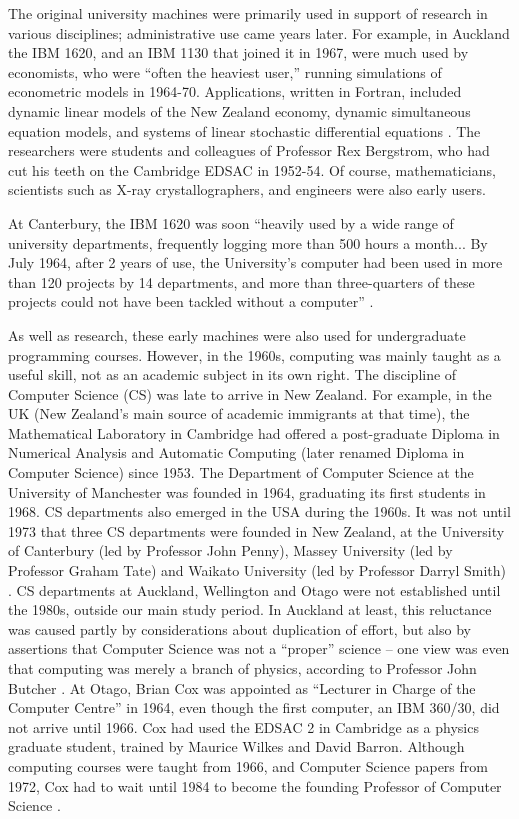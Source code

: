 \documentclass{IEEEcsmag}
\begin{document}
The original university machines were primarily used in support of research in various disciplines; administrative use came years later. For example, in Auckland the IBM 1620, and an IBM 1130 that joined it in 1967, were much used by economists, who were “often the heaviest user,” running simulations of econometric models in 1964-70. Applications, written in Fortran, included dynamic linear models of the New Zealand economy, dynamic simultaneous equation models, and systems of linear stochastic differential equations \cite{Phillips-UoA}. The researchers were students and colleagues of Professor Rex Bergstrom, who had cut his teeth on the Cambridge EDSAC in 1952-54. Of course, mathematicians, scientists such as X-ray crystallographers, and engineers were also early users.

At Canterbury, the IBM 1620 was soon “heavily used by a wide range of university departments, frequently logging more than 500 hours a month... By July
1964, after 2 years of use, the University’s computer had been used in more than 120 projects by 14 departments,
and more than three-quarters of these projects could not have been tackled without a computer” \cite{Dale-Canty2}.

As well as research, these early machines were also used for undergraduate programming courses. However, in the 1960s, computing was mainly taught as a useful skill, not as an academic subject in its own right. The discipline of Computer Science (CS) was late to arrive in New Zealand. For example, in the UK (New Zealand’s main source of academic immigrants at that time), the Mathematical Laboratory in Cambridge had offered a post-graduate Diploma in Numerical Analysis and Automatic Computing (later renamed Diploma in Computer Science) since 1953. The Department of Computer Science at the University of Manchester was founded in 1964, graduating its first students in 1968. CS departments also emerged in the USA during the 1960s. It was not until 1973 that three CS
departments were founded in New Zealand, at the University of Canterbury (led by Professor John Penny),  Massey University (led by Professor Graham Tate) and Waikato University (led by Professor Darryl Smith) \cite{Bell, Waikato-50}.
CS departments at Auckland, Wellington and Otago were not established until the 1980s, outside our main study period. In Auckland at least, this reluctance was caused partly by considerations about duplication of effort, but also by assertions that Computer Science was not a “proper” science -- one view was even that computing was merely a branch of physics, according to Professor John Butcher \cite{Butcher-private}. At Otago, Brian Cox was appointed as “Lecturer in Charge of the Computer Centre” in 1964, even though the first computer, an IBM 360/30, did not arrive until 1966. Cox had used the EDSAC 2 in Cambridge as a physics graduate student, trained by Maurice Wilkes and David Barron. Although computing courses were taught from 1966, and Computer Science papers from 1972, Cox had to wait until 1984 to become the founding Professor of Computer Science \cite{Otago-history}.
\end{document}
